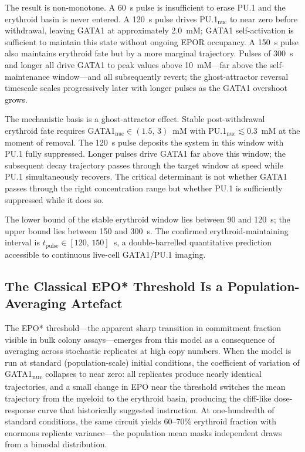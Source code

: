 The result is non-monotone. A 60~s pulse is insufficient to erase
PU.1 and the erythroid basin is never entered. A 120~s pulse drives
PU.1$_\text{nuc}$ to near zero before withdrawal, leaving GATA1 at approximately
2.0~mM; GATA1 self-activation is sufficient to maintain this state without
ongoing EPOR occupancy. A 150~s pulse also maintains erythroid fate but by a
more marginal trajectory. Pulses of 300~s and longer all drive GATA1 to peak
values above 10~mM---far above the self-maintenance window---and all subsequently
revert; the ghost-attractor reversal timescale scales progressively later with
longer pulses as the GATA1 overshoot grows.

The mechanistic basis is a ghost-attractor effect. Stable post-withdrawal
erythroid fate requires GATA1$_\text{nuc}\in(1.5,\,3)$~mM with
PU.1$_\text{nuc}\lesssim 0.3$~mM at the moment of removal. The 120~s pulse
deposits the system in this window with PU.1 fully suppressed. Longer pulses
drive GATA1 far above this window; the subsequent decay trajectory passes
through the target window at speed while PU.1 simultaneously recovers. The
critical determinant is not whether GATA1 passes through the right concentration
range but whether PU.1 is sufficiently suppressed while it does so.

The lower bound of the stable erythroid window lies between 90 and 120~s; the
upper bound lies between 150 and 300~s. The confirmed erythroid-maintaining
interval is $t_{\mathrm{pulse}} \in [120,\,150]$~s, a double-barrelled
quantitative prediction accessible to continuous live-cell GATA1/PU.1 imaging.

\subsection{The Classical EPO* Threshold Is a Population-Averaging Artefact}
\label{sec:epostar}

The EPO* threshold---the apparent sharp transition in commitment fraction visible
in bulk colony assays---emerges from this model as a consequence of averaging
across stochastic replicates at high copy numbers. When the model is run at
standard (population-scale) initial conditions, the coefficient of variation of
GATA1\textsubscript{nuc} collapses to near zero: all replicates produce nearly
identical trajectories, and a small change in EPO near the threshold switches
the mean trajectory from the myeloid to the erythroid basin, producing the
cliff-like dose-response curve that historically suggested instruction. At
one-hundredth of standard conditions, the same circuit yields 60--70\% erythroid
fraction with enormous replicate variance---the population mean masks independent
draws from a bimodal distribution.


